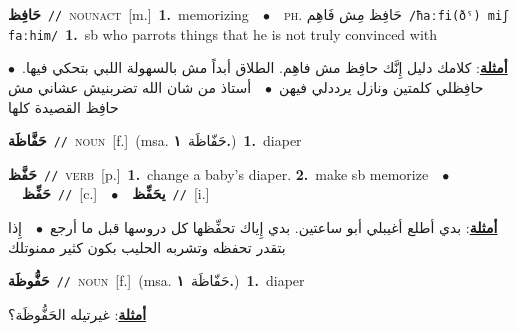 \documentclass[10pt,a4paper,twoside]{article} %
\begin{document}
\begin{multicols}{2}
{\setlength\topsep{0pt}\textbf{\foreignlanguage{arabic}{حَافِظ}}\ {\color{gray}\texttt{//}\color{black}}\ \textsc{noun\textunderscore act}\ [m.]\ \textbf{1.}~memorizing\ \ $\bullet$\ \ \textsc{ph.} \color{gray} \foreignlanguage{arabic}{حَافِظ مِش فَاهِم}\color{black}\ {\color{gray}\texttt{/{\sffamily ħaːfi(ðˤ) miʃ faːhim}/}\color{black}}\ \textbf{1.}~sb who parrots things that he is not truly convinced with\  \begin{flushright}\color{gray}\foreignlanguage{arabic}{\textbf{\underline{\foreignlanguage{arabic}{أمثلة}}}: كلامك دليل إِنَّك حافِظ مش فاهِم. الطلاق أبداً مش بالسهولة اللبي بتحكي فيها.\ $\bullet$\ \  حافِظلي كلمتين ونازل يرددلي فيهن\ $\bullet$\ \  أستاذ من شان الله تضربنيش عشاني مش حافِظ القصيدة كلها}\end{flushright}\color{black}} \vspace{2mm}

{\setlength\topsep{0pt}\textbf{\foreignlanguage{arabic}{حَفَّاظَة}}\ {\color{gray}\texttt{//}\color{black}}\ \textsc{noun}\ [f.]\ \color{gray}(msa. \foreignlanguage{arabic}{حَفّاظَة}~\foreignlanguage{arabic}{\textbf{١.}})\color{black}\ \textbf{1.}~diaper\ } \vspace{2mm}

{\setlength\topsep{0pt}\textbf{\foreignlanguage{arabic}{حَفَّظ}}\ {\color{gray}\texttt{//}\color{black}}\ \textsc{verb}\ [p.]\ \textbf{1.}~change a baby's diaper.  \textbf{2.}~make sb memorize\ \ $\bullet$\ \ \setlength\topsep{0pt}\textbf{\foreignlanguage{arabic}{حَفِّظ}}\ {\color{gray}\texttt{//}\color{black}}\ [c.]\ \ $\bullet$\ \ \setlength\topsep{0pt}\textbf{\foreignlanguage{arabic}{يحَفِّظ}}\ {\color{gray}\texttt{//}\color{black}}\ [i.]\  \begin{flushright}\color{gray}\foreignlanguage{arabic}{\textbf{\underline{\foreignlanguage{arabic}{أمثلة}}}: بدي أطلع أغيبلي أبو ساعتين. بدي إِياك تحفِّظها كل دروسها قبل ما أرجع\ $\bullet$\ \  إِذا بتقدر تحفظه وتشربه الحليب بكون كثير ممنوتلك}\end{flushright}\color{black}} \vspace{2mm}

{\setlength\topsep{0pt}\textbf{\foreignlanguage{arabic}{حَفُّوظَة}}\ {\color{gray}\texttt{//}\color{black}}\ \textsc{noun}\ [f.]\ \color{gray}(msa. \foreignlanguage{arabic}{حَفّاظَة}~\foreignlanguage{arabic}{\textbf{١.}})\color{black}\ \textbf{1.}~diaper\  \begin{flushright}\color{gray}\foreignlanguage{arabic}{\textbf{\underline{\foreignlanguage{arabic}{أمثلة}}}: غيرتيله الحَفُّوظَة؟}\end{flushright}\color{black}} \vspace{2mm}


\end{multicols}
\end{document}
